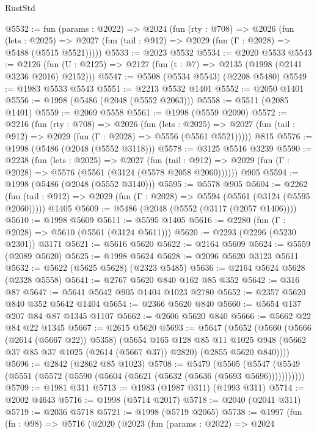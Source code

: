\begin{lexlean}{RustStd}
\begin{coremodule}
@5532 := fun (params : @2022) =>
  @2024
    (fun (rty : @708) =>
    @2026
      (fun (lets : @2025) =>
      @2027 (fun (tail : @912) => @2029 (fun (Γ : @2028) => @5488 (@5515 @5521)))))
@5533 := @2023 @5532
@5534 := @2020 @5533
@5543 := @2126 (fun (U : @2125) => @2127 (fun (t : @7) => @2135 (@1998 (@2141 @3236 @2016) @2152)))
@5547 := @5508 (@5534 @5543) (@2208 @5480)
@5549 := @1983 @5533 @5543
@5551 := @2213 @5532 @1401
@5552 := @2050 @1401
@5556 := @1998 (@5486 (@2048 (@5552 @2063)))
@5558 := @5511 (@2085 @1401)
@5559 := @2069 @5558
@5561 := @1998 (@5559 @2090)
@5572 := @2216
    (fun (rty : @708) =>
    @2026
      (fun (lets : @2025) =>
      @2027 (fun (tail : @912) => @2029 (fun (Γ : @2028) => @5556 (@5561 @5521)))))
    @815
@5576 := @1998 (@5486 (@2048 (@5552 @3118)))
@5578 := @3125 @5516 @3239
@5590 := @2238
    (fun (lets : @2025) =>
    @2027
      (fun (tail : @912) => @2029 (fun (Γ : @2028) => @5576 (@5561 (@3124 (@5578 @2058 @2060))))))
    @905
@5594 := @1998 (@5486 (@2048 (@5552 @3140)))
@5595 := @5578 @905
@5604 := @2262
    (fun (tail : @912) => @2029 (fun (Γ : @2028) => @5594 (@5561 (@3124 (@5595 @2060)))))
    @1405
@5609 := @5486 (@2048 (@5552 (@3117 (@2057 @1406))))
@5610 := @1998 @5609
@5611 := @5595 @1405
@5616 := @2280 (fun (Γ : @2028) => @5610 (@5561 (@3124 @5611)))
@5620 := @2293 (@2296 (@5230 @2301)) @3171
@5621 := @5616 @5620
@5622 := @2164 @5609
@5624 := @5559 (@2089 @5620)
@5625 := @1998 @5624
@5628 := @2096 @5620 @3123 @5611
@5632 := @5622 (@5625 @5628) (@2323 @5485)
@5636 := @2164 @5624 @5628 (@2328 @5558)
@5641 := @2767 @5620 @840 @162 @85 @352
@5642 := @316 @87
@5647 := @5641 @5642 @905 @1404 @1023 @2780
@5652 := @2357 @5620 @840 @352 @5642 @1404
@5654 := @2366 @5620 @840
@5660 := @5654 @137 @207 @84 @87 @1345 @1107
@5662 := @2606 @5620 @840
@5666 := @5662 @22 @84 @22 @1345
@5667 := @2615 @5620
@5693 := @5647
    (@5652
      (@5660
        (@5666 (@2614 (@5667 @22)) @5358)
        (@5654
          @165
          @128
          @85
          @11
          @1025
          @948
          (@5662 @37 @85 @37 @1025 (@2614 (@5667 @37)) @2820)
          (@2855 @5620 @840))))
@5696 := @2842 (@2862 @85 @1023)
@5708 := @5479
    (@5505 (@5547 (@5549 (@5551 (@5572 (@5590 (@5604 (@5621 (@5632 (@5636 (@5693 @5696)))))))))))
@5709 := @1981 @311
@5713 := @1983 (@1987 @311) (@1993 @311)
@5714 := @2002 @4643
@5716 := @1998 (@5714 @2017)
@5718 := @2040 (@2041 @311)
@5719 := @2036 @5718
@5721 := @1998 (@5719 @2065)
@5738 := @1997
    (fun (fn : @98) =>
    @5716
      (@2020
        (@2023
          (fun (params : @2022) =>
          @2024

\end{coremodule}
\end{lexlean}
